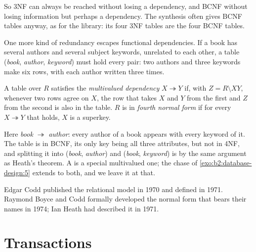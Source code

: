 So 3NF can always be reached without losing a dependency, and BCNF without losing information but perhaps a dependency.
The synthesis often gives BCNF tables anyway, as for the library: its four 3NF tables are the four BCNF tables.

One more kind of redundancy escapes functional dependencies. If a book has several authors and several subject
keywords, unrelated to each other, a table (\emph{book}, \emph{author}, \emph{keyword}) must hold every pair: two authors
and three keywords make six rows, with each author written three times.

\begin{definition}\label{def:b2:database-design:mvd}
A table over $R$ satisfies the \emph{multivalued dependency} $X \twoheadrightarrow Y$ if,
with $Z = R \setminus XY$, whenever two rows agree on $X$, the row that takes $X$ and $Y$ from the first and $Z$ from the
second is also in the table. $R$ is in \emph{fourth normal form} if for every 
$X \twoheadrightarrow Y$ that holds, $X$ is a superkey.
\end{definition}

Here \emph{book} $\twoheadrightarrow$ \emph{author}: every author of a book appears with every keyword of it. The table
is in BCNF, its only key being all three attributes, but not in 4NF, and splitting it into (\emph{book}, \emph{author})
and (\emph{book}, \emph{keyword}) is  by the same argument as Heath's theorem. A  is a
special multivalued one; the chase of \cref{exo:b2:database-design:5} extends to both, and we leave it at that.

\begin{history}
Edgar Codd published the relational model in 1970 and defined  in 1971. Raymond Boyce and Codd
formally developed the normal form that bears their names in 1974; Ian Heath had described it in 1971.
\end{history}

\section{Transactions}\label{sec:b2:database-design:transactions}

